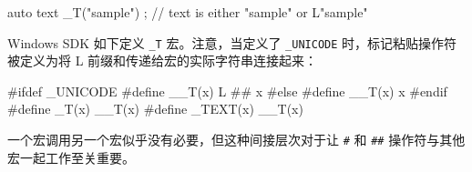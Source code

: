 \begin{cpp}
auto text{ _T("sample") }; // text is either "sample" or L"sample"
\end{cpp}

Windows SDK 如下定义 \verb|_T| 宏。注意，当定义了 \verb|_UNICODE| 时，标记粘贴操作符被定义为将 L 前缀和传递给宏的实际字符串连接起来：

\begin{cpp}
#ifdef _UNICODE
#define __T(x)   L ## x
#else
#define __T(x)   x
#endif
#define _T(x)    __T(x)
#define _TEXT(x) __T(x)
\end{cpp}

一个宏调用另一个宏似乎没有必要，但这种间接层次对于让 \verb|#| 和 \verb|##| 操作符与其他宏一起工作至关重要。





